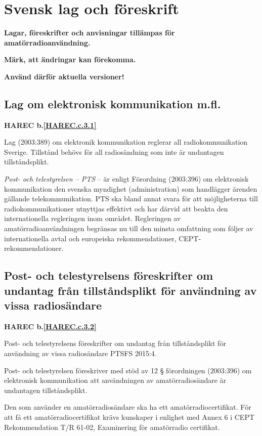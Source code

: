 \section{Svensk lag och föreskrift}

\textbf{Lagar, föreskrifter och anvisningar tillämpas för
  amatörradioanvändning.}

\textbf{Märk, att ändringar kan förekomma.}

\textbf{Använd därför aktuella versioner!}


\subsection{Lag om elektronisk kommunikation m.fl.}
\textbf{
HAREC b.\ref{HAREC.c.3.1}\label{myHAREC.c.3.1}
}

Lag (2003:389) om elektronik kommunikation reglerar all radiokommunikation Sverige. Tillstånd behövs för all radiosändning som inte är undantagen
tillståndsplikt.

\emph{Post- och telestyrelsen -- PTS} -- är enligt Förordning (2003:396) om
elektronisk kommunikation den svenska myndighet (administration) som handlägger
ärenden gällande telekommunikation. PTS ska bland annat svara för att
möjligheterna till radiokommunikationer utnyttjas effektivt och har därvid att
beakta den internationella regleringen inom området. Regleringen av
amatörradioanvändningen begränsas nu till den minsta omfattning som
följer av internationella avtal och europeiska rekommendationer,
CEPT-rekommendationer.

\subsection{Post- och telestyrelsens föreskrifter om undantag från tillståndsplikt för användning av vissa radiosändare}
\textbf{
HAREC b.\ref{HAREC.c.3.2}\label{myHAREC.c.3.2}
}

Post- och telestyrelsens föreskrifter om undantag från tillståndsplikt för
användning av vissa radiosändare PTSFS 2015:4.

Post- och telestyrelsen föreskriver med stöd av 12 § förordningen (2003:396)
om elektronisk kommunikation att användningen av amatörradiosändare är
undantagen tillståndsplikt.

Den som använder en amatörradiosändare ska ha ett amatörradiocertifikat. För
att få ett amatörradiocertifikat krävs kunskaper i enlighet med Annex 6 i
CEPT Rekommendation T/R 61-02, Examinering för amatörradio certifikat.

